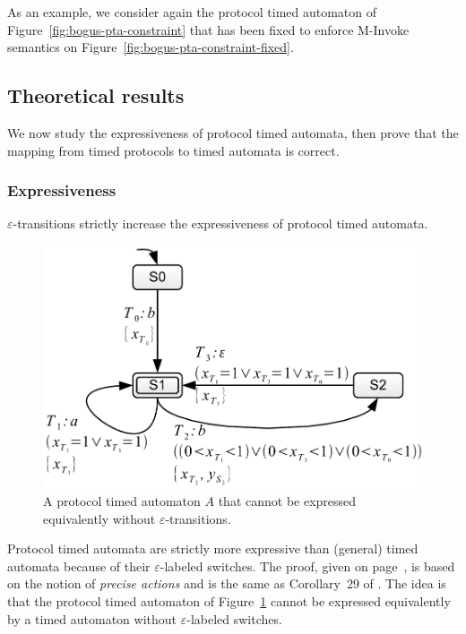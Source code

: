 As an example, we consider again the protocol timed automaton of Figure~\ref{fig:bogus-pta-constraint} that has been fixed to enforce M-Invoke semantics on Figure~\ref{fig:bogus-pta-constraint-fixed}.


\subsection{Theoretical results}


We now study the expressiveness of protocol timed automata, then prove that the mapping from timed protocols to timed automata is correct.

\subsubsection{Expressiveness}

\begin{theorem}
$\varepsilon$-transitions strictly increase the expressiveness of protocol timed automata.
\label{thm:mi-expressiveness}
\end{theorem}

\begin{figure}[htbp]
  \includegraphics[width=\textwidth]{content/protocol-model/precise-time}
  \caption{A protocol timed automaton $A$ that cannot be expressed equivalently without $\varepsilon$-transitions.}
  \label{fig:precise-time}
\end{figure}

Protocol timed automata are strictly more expressive than (general) timed automata because of their $\varepsilon$-labeled switches. The proof, given on page~\pageref{proof:mi-expressiveness}, is based on the notion of \emph{precise actions} and is the same as Corollary~29 of \cite{BBVD+99}. The idea is that the protocol timed automaton of Figure~\ref{fig:precise-time} cannot be expressed equivalently by a timed automaton without $\varepsilon$-labeled switches.

